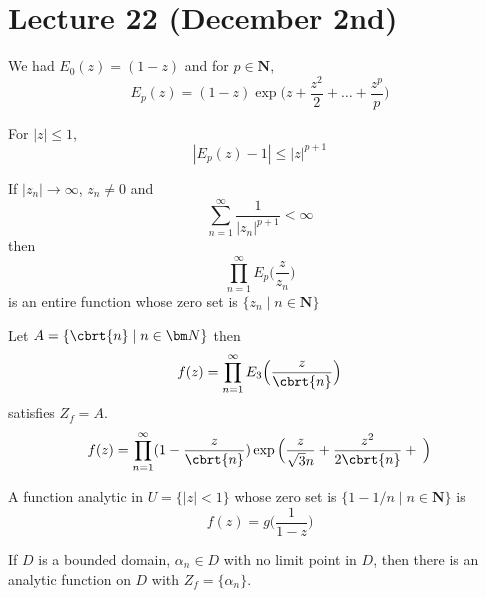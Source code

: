 \section{Lecture 22 (December 2nd)}
\begin{recall}
We had $E_0(z)=(1-z)$ and for $p\in {\bm N}$, 
\[E_{p}(z)=(1-z)\exp \Big(z+\dfrac{z^2}{2}+\ldots +\dfrac{z^{p}}{p}\Big)\]
\end{recall}
\vspace{2ex}
\begin{thm}
For $|z|\leq 1$, 
\[|E_{p}(z)-1|\leq |z|^{p+1}\]
\end{thm}
\vspace{2ex}
\begin{thm}
If $|z_{n}|\rightarrow \infty $, $z_{n}\ne 0$ and
\[\sum ^{\infty }_{n=1}\dfrac{1}{|z_{n}|^{p+1}}<\infty \]
then 
\[\prod^{\infty }_{n=1}E_{p}\Big(\dfrac{z}{z_{n}}\Big)\]
is an entire function whose zero set is $\{z_{n}\;|\;n\in {\bm N}\}$
\end{thm}
\vspace{2ex}
\begin{ex}
Let $A=\{\cbrt{n}\;|\;n\in {\bm N}\}$ then 
\[f(z)=\prod^{\infty }_{n=1}E_{3}\Big(\dfrac{z}{\cbrt{n}}\Big)\]
satisfies $Z_{f}=A$.
\[f(z)=\prod^{\infty }_{n=1}(1-\dfrac{z}{\cbrt{n}})\exp\Big(\dfrac{z}{\sqrt{3}{n}}+\dfrac{z^2}{2\cbrt{n}}+\dfrac{}{}\Big) \]
\end{ex}
\vspace{2ex}
\begin{ex}
A function analytic in $U=\{|z|<1\}$ whose zero set is $\{1-1/n\;|\;n\in {\bm N}\}$ is
\[f(z)=g\Big(\dfrac{1}{1-z}\Big)\]
\end{ex}
\vspace{2ex}
\begin{thm}
If $D$ is a bounded domain, $\alpha _{n}\in D$ with no limit point in $D$, then there is an analytic function on $D$ with $Z_{f}=\{\alpha _{n}\}$.
\end{thm}
\vspace{2ex}
